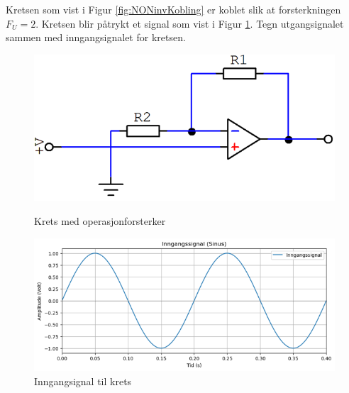 \begin{question}[name=Oppgave, topic=operasjonsforsterker]

Kretsen som vist i Figur \ref{fig:NONinvKobling} er koblet slik at forsterkningen $F_U = 2$. Kretsen blir påtrykt et signal som vist i Figur \ref{fig:NONinvPlot}. Tegn utgangsignalet sammen med inngangsignalet for kretsen.

	\begin{figure}[H]
		\begin{minipage}[c]{0.45\linewidth}
			\includegraphics[width=\linewidth]{operasjonsforsterker/figurer/NONinvBasic.png}
			\caption{Krets med operasjonforsterker}
			\label{fig:NONinvKobling}
		\end{minipage}
		\hfill
		\begin{minipage}[c]{0.45\linewidth}
			\includegraphics[width=\linewidth]{operasjonsforsterker/plot/NONInvPlot.png}
			\caption{Inngangsignal til krets}
			\label{fig:NONinvPlot}
		\end{minipage}
	\end{figure}

\end{question}

\vspace{0.5cm} %

